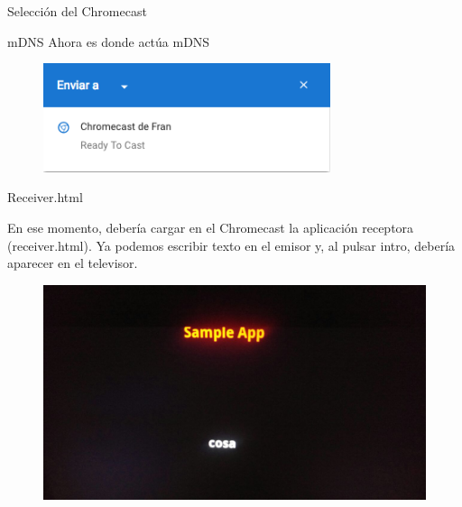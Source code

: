 \begin{frame}{Selección del Chromecast}
	\begin{block}{mDNS}
		Ahora es donde actúa mDNS
	\end{block}
	\vspace{0.5cm}
	\begin{figure}[H]
		\centering
		\includegraphics[width=0.75\textwidth]{./Imagenes/seleccion.png}
	\end{figure}
\end{frame}



\begin{frame}{Receiver.html}
	\begin{block}{ }
		En ese momento, debería cargar en el Chromecast la aplicación receptora (receiver.html).
		Ya podemos escribir texto en el emisor y, al pulsar intro, debería aparecer en el televisor.
	\end{block}
\end{frame}


\begin{frame}
	\begin{figure}[H]
		\centering
		\includegraphics[width=1\textwidth]{./Imagenes/receptor.jpg}
	\end{figure}
\end{frame}